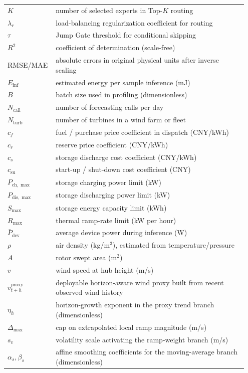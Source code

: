 \documentclass[review,1p,times]{elsarticle}
\begin{document}
\begin{longtable}{@{}p{0.17\linewidth}L{0.78\linewidth}@{}}
$K$ & number of selected experts in Top-$K$ routing \\
$\lambda_r$ & load-balancing regularization coefficient for routing \\
$\tau$ & Jump Gate threshold for conditional skipping \\
$R^2$ & coefficient of determination (scale-free) \\
RMSE/MAE & absolute errors in original physical units after inverse scaling \\
$E_{\text{inf}}$ & estimated energy per sample inference (mJ) \\
$B$ & batch size used in profiling (dimensionless) \\
$N_{\text{call}}$ & number of forecasting calls per day \\
$N_{\text{turb}}$ & number of turbines in a wind farm or fleet \\
$c_f$ & fuel / purchase price coefficient in dispatch (CNY/kWh) \\
$c_r$ & reserve price coefficient (CNY/kWh) \\
$c_s$ & storage discharge cost coefficient (CNY/kWh) \\
$c_{\text{su}}$ & start-up / shut-down cost coefficient (CNY) \\
$P_{\text{ch},\max}$ & storage charging power limit (kW) \\
$P_{\text{dis},\max}$ & storage discharging power limit (kW) \\
$S_{\max}$ & storage energy capacity limit (kWh) \\
$R_{\max}$ & thermal ramp-rate limit (kW per hour) \\
$\bar{P}_{\text{dev}}$ & average device power during inference (W) \\
$\rho$ & air density (kg/m$^3$), estimated from temperature/pressure \\
$A$ & rotor swept area (m$^2$) \\
$v$ & wind speed at hub height (m/s) \\
$v_{t+h}^{\mathrm{proxy}}$ & deployable horizon-aware wind proxy built from recent observed wind history \\
$\eta_h$ & horizon-growth exponent in the proxy trend branch (dimensionless) \\
$\Delta_{\max}$ & cap on extrapolated local ramp magnitude (m/s) \\
$s_v$ & volatility scale activating the ramp-weight branch (m/s) \\
$\alpha_s,\beta_s$ & affine smoothing coefficients for the moving-average branch (dimensionless) \\

\end{longtable}
\end{document}
